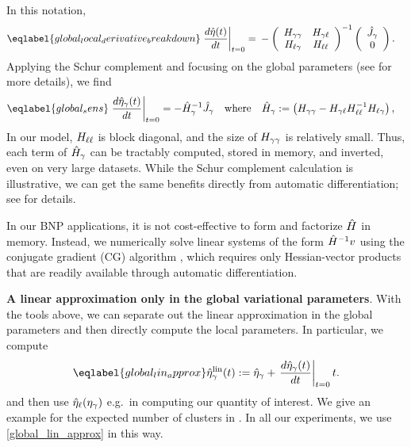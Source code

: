 In this notation,
%
\begin{align} \eqlabel{global_local_derivative_breakdown}
%
\fracat{d \etaopt(\t)}{d \t}{t = 0} ={}&
-\left(
\begin{array}{cc}
   \hess{\gamma\gamma} & \hess{\gamma\ell} \\
   \hess{\ell\gamma}     & \hess{\ell\ell} \\
\end{array}
\right)^{-1}
\left( \begin{array}{c} \crosshessian_\gamma \\ 0 \end{array}\right).
%
\end{align}
%
Applying the Schur complement and focusing on the global parameters (see
 for more details), we find
%
\begin{align}\eqlabel{global_sens}
  \fracat{d \etaopt_\gamma(\t)}{d \t}{t = 0} &=
  - \hessopt_\gamma^{-1}\crosshessian_\gamma
  \mathwhere
  \hessopt_\gamma := \left(\hess{\gamma\gamma} -
        \hess{\gamma\ell} \hess{\ell\ell}^{-1} \hess{\ell\gamma}\right),
\end{align}
%
In our model, $H_{\ell\ell}$ is block diagonal, and the size of
$H_{\gamma\gamma}$ is relatively small. Thus, each term of $\hat{H}_\gamma$
can be tractably computed, stored in memory, and inverted, even on very large
datasets. While the Schur complement calculation is illustrative, we can get the
same benefits directly from automatic differentiation; see 
for details.

In our BNP applications, it is not cost-effective to form and factorize
$\hat{H}$ in memory.  Instead, we numerically solve linear systems of the form
$\hat{H}^{-1} v$ using the conjugate gradient (CG) algorithm \citep[Chapter
5]{nocedal:2006:numerical}, which requires only Hessian-vector products that are
readily available through automatic differentiation.

\noindent \textbf{A linear approximation only in the global variational parameters}.
%
With the tools above, we can separate out the linear approximation in the global
parameters and then directly compute the local parameters. In particular, we
compute
%
\begin{align}\eqlabel{global_lin_approx}
  \etalin_\gamma(\t) := \etaopt_\gamma +
  \fracat{d \etaopt_\gamma(\t)}{d \t}{\t=0} \t .
\end{align}
%
and then use $\hat\eta_{\ell}(\eta_{\gamma})$ e.g.\ in computing our quantity of
interest. We give an example for the expected number of clusters in
.  In all our experiments, we use
\eqref{global_lin_approx} in this way.
